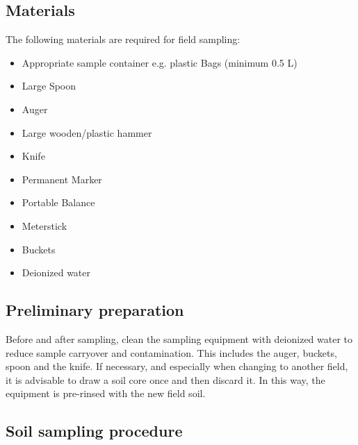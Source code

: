 \begin{refsection}
\subsection*{Materials}

The following materials are required for field sampling:

\begin{itemize}
  \item Appropriate sample container e.g. plastic Bags (minimum 0.5 L) 
  \item Large Spoon
  \item Auger
  \item Large wooden/plastic hammer
  \item Knife
  \item Permanent Marker
  \item Portable Balance
  \item Meterstick
  \item Buckets
  \item Deionized water
\end{itemize}

\subsection*{Preliminary preparation}

Before and after sampling, clean the sampling equipment with deionized water to reduce sample carryover and contamination. This includes the auger, buckets, spoon and the knife. If necessary, and especially when changing to another field, it is advisable to draw a soil core once and then discard it. In this way, the equipment is pre-rinsed with the new field soil.

\subsection*{Soil sampling procedure}


\end{refsection}
